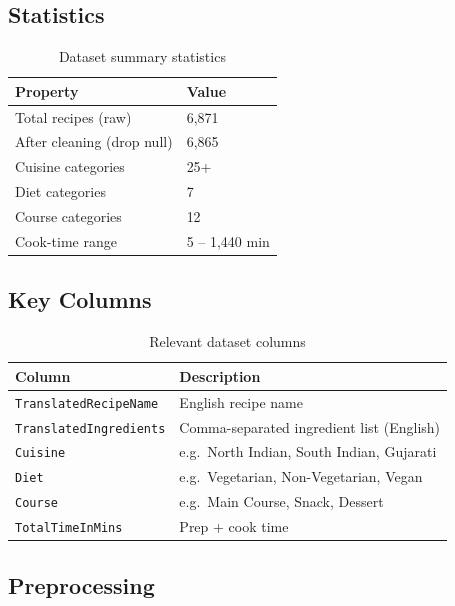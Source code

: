 \documentclass[12pt,a4paper]{article}
\begin{document}
\subsection{Statistics}

\begin{table}[H]
  \centering
  \begin{tabular}{ll}
    \toprule
    Property & Value \\
    \midrule
    Total recipes (raw) & 6{,}871 \\
    After cleaning (drop null) & 6{,}865 \\
    Cuisine categories & 25+ \\
    Diet categories & 7 \\
    Course categories & 12 \\
    Cook-time range & 5 – 1{,}440 min \\
    \bottomrule
  \end{tabular}
  \caption{Dataset summary statistics}
\end{table}

\subsection{Key Columns}

\begin{table}[H]
  \centering
  \begin{tabular}{ll}
    \toprule
    Column & Description \\
    \midrule
    \texttt{TranslatedRecipeName} & English recipe name \\
    \texttt{TranslatedIngredients} & Comma-separated ingredient list (English) \\
    \texttt{Cuisine} & e.g.\ North Indian, South Indian, Gujarati \\
    \texttt{Diet} & e.g.\ Vegetarian, Non-Vegetarian, Vegan \\
    \texttt{Course} & e.g.\ Main Course, Snack, Dessert \\
    \texttt{TotalTimeInMins} & Prep + cook time \\
    \bottomrule
  \end{tabular}
  \caption{Relevant dataset columns}
\end{table}

\subsection{Preprocessing}
\end{document}
